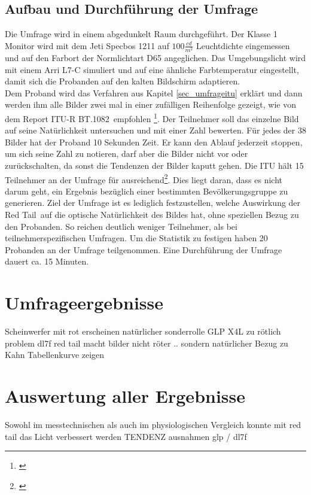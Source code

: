 \section{Aufbau und Durchführung der Umfrage} 
Die Umfrage wird in einem abgedunkelt Raum durchgeführt. Der Klasse 1 Monitor wird mit dem Jeti Specbos 1211 auf $100\frac{cd}{m^{2}}$ Leuchtdichte eingemessen und auf den Farbort der Normlichtart D65 angeglichen. Das Umgebungslicht wird mit einem Arri L7-C simuliert und  auf eine ähnliche Farbtemperatur eingestellt, damit sich die Probanden auf den kalten Bildschirm adaptieren.\\
Dem Proband wird das Verfahren aus Kapitel \ref{sec_umfrageitu}  erklärt und dann werden ihm alle Bilder zwei mal in einer zufälligen Reihenfolge gezeigt, wie von dem \glqq Report ITU-R BT.1082\grqq\ empfohlen \footnote{\cite[368]{itu90}}. Der Teilnehmer soll das einzelne Bild auf seine Natürlichkeit untersuchen und mit einer Zahl bewerten. Für jedes der 38 Bilder hat der Proband 10 Sekunden Zeit. Er kann den Ablauf jederzeit stoppen, um sich seine Zahl zu notieren, darf aber die Bilder nicht vor oder zurückschalten, da sonst die Tendenzen der Bilder kaputt gehen. Die ITU hält 15 Teilnehmer an der Umfrage für ausreichend\footnote{\cite[368]{itu90}}. Dies liegt daran, dass es nicht darum geht, ein Ergebnis bezüglich einer bestimmten Bevölkerungsgruppe zu generieren. Ziel der Umfrage ist es lediglich festzustellen, welche Auswirkung der \glqq Red Tail\grqq\ auf die optische Natürlichkeit des Bildes hat, ohne speziellen Bezug zu den Probanden. So reichen deutlich weniger Teilnehmer, als bei teilnehmerspezifischen Umfragen. Um die Statistik zu festigen haben 20 Probanden an der Umfrage teilgenommen. Eine Durchführung der Umfrage dauert ca. 15 Minuten.


\chapter{Umfrageergebnisse}

Scheinwerfer mit rot erscheinen natürlicher 
sonderrolle GLP X4L zu rötlich
problem dl7f
red tail macht bilder nicht röter .. sondern natürlicher
Bezug zu Kahn
Tabellenkurve zeigen


\chapter{Auswertung aller Ergebnisse}
Sowohl im messtechnischen als auch im physiologischen Vergleich konnte mit red tail das Licht verbessert werden TENDENZ
ausnahmen glp / dl7f



